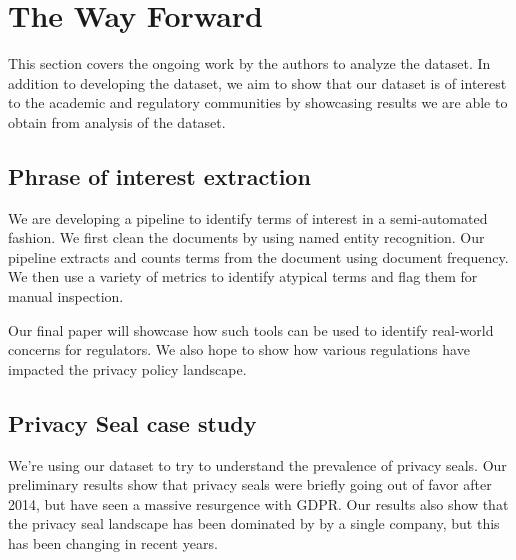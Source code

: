 \section{The Way Forward}

This section covers the ongoing work by the authors to analyze the dataset. In addition to developing the dataset, we aim to show that our dataset is of interest to the academic and regulatory communities by showcasing results we are able to obtain from analysis of the dataset.

\subsection{Phrase of interest extraction}
We are developing a pipeline to identify terms of interest in a semi-automated fashion. We first clean the documents by using named entity recognition. Our pipeline extracts and counts terms from the document using document frequency. We then use a variety of metrics to identify atypical terms and flag them for manual inspection.

Our final paper will showcase how such tools can be used to identify real-world concerns for regulators. We also hope to show how various regulations have impacted the privacy policy landscape.

\subsection{Privacy Seal case study}
We're using our dataset to try to understand the prevalence of privacy seals. Our preliminary results show that privacy seals were briefly going out of favor after 2014, but have seen a massive resurgence with GDPR. Our results also show that the privacy seal landscape has been dominated by by a single company, but this has been changing in recent years.

%
